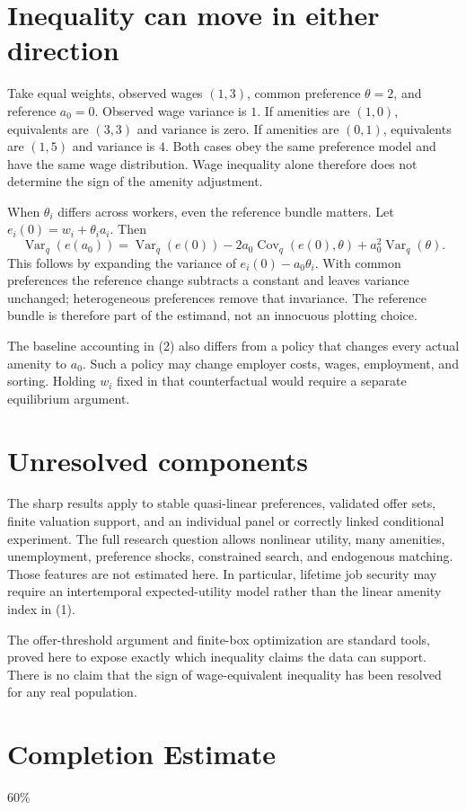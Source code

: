 \documentclass[11pt,a4paper]{article}
\DeclareMathOperator{\Var}{Var}
\DeclareMathOperator{\Cov}{Cov}
\begin{document}
\section{Inequality can move in either direction}
Take equal weights, observed wages $(1,3)$, common preference $\theta=2$, and reference $a_0=0$. Observed wage variance is $1$. If amenities are $(1,0)$, equivalents are $(3,3)$ and variance is zero. If amenities are $(0,1)$, equivalents are $(1,5)$ and variance is $4$. Both cases obey the same preference model and have the same wage distribution. Wage inequality alone therefore does not determine the sign of the amenity adjustment.

When $\theta_i$ differs across workers, even the reference bundle matters. Let $e_i(0)=w_i+\theta_i a_i$. Then
\[
 \Var_q(e(a_0))
 =\Var_q(e(0))-2a_0\Cov_q(e(0),\theta)
       +a_0^2\Var_q(\theta).
 \tag{5}
\]
This follows by expanding the variance of $e_i(0)-a_0\theta_i$. With common preferences the reference change subtracts a constant and leaves variance unchanged; heterogeneous preferences remove that invariance. The reference bundle is therefore part of the estimand, not an innocuous plotting choice.

The baseline accounting in (2) also differs from a policy that changes every actual amenity to $a_0$. Such a policy may change employer costs, wages, employment, and sorting. Holding $w_i$ fixed in that counterfactual would require a separate equilibrium argument.
\section{Unresolved components}
The sharp results apply to stable quasi-linear preferences, validated offer sets, finite valuation support, and an individual panel or correctly linked conditional experiment. The full research question allows nonlinear utility, many amenities, unemployment, preference shocks, constrained search, and endogenous matching. Those features are not estimated here. In particular, lifetime job security may require an intertemporal expected-utility model rather than the linear amenity index in (1).

The offer-threshold argument and finite-box optimization are standard tools, proved here to expose exactly which inequality claims the data can support. There is no claim that the sign of wage-equivalent inequality has been resolved for any real population.

\section{Completion Estimate}
60\%
\end{document}
